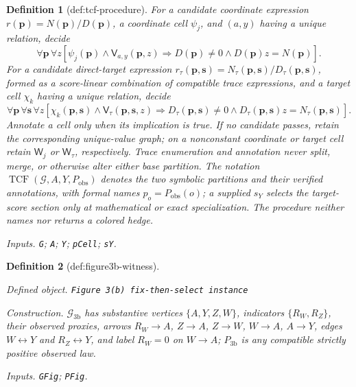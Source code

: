 \documentclass{article}
\newtheorem{definition}{Definition}
\begin{document}
\begin{definition}[def:tcf-procedure]
For a candidate coordinate expression \(r(\mathbf p)=N(\mathbf p)/D(\mathbf p)\), a coordinate cell \(\psi_j\), and \((a,y)\) having a unique relation, decide
\[
\forall\mathbf p\,\forall z
\left[
\psi_j(\mathbf p)\wedge\mathsf V_{a,y}(\mathbf p,z)
\Longrightarrow
D(\mathbf p)\neq0\wedge D(\mathbf p)z=N(\mathbf p)
\right].
\]
For a candidate direct-target expression \(r_{\tau}(\mathbf p,\mathbf s)=N_{\tau}(\mathbf p,\mathbf s)/D_{\tau}(\mathbf p,\mathbf s)\), formed as a score-linear combination of compatible trace expressions, and a target cell \(\chi_k\) having a unique relation, decide
\[
\forall\mathbf p\,\forall\mathbf s\,\forall z
\left[
\chi_k(\mathbf p,\mathbf s)\wedge\mathsf V_{\tau}(\mathbf p,\mathbf s,z)
\Longrightarrow
D_{\tau}(\mathbf p,\mathbf s)\neq0
\wedge D_{\tau}(\mathbf p,\mathbf s)z=N_{\tau}(\mathbf p,\mathbf s)
\right].
\]
Annotate a cell only when its implication is true. If no candidate passes, retain the corresponding unique-value graph; on a nonconstant coordinate or target cell retain \(\mathsf W_j\) or \(\mathsf W_{\tau}\), respectively. Trace enumeration and annotation never split, merge, or otherwise alter either base partition. The notation \(\operatorname{TCF}(\mathcal G,A,Y,P_{\mathrm{obs}})\) denotes the two symbolic partitions and their verified annotations, with formal names \(p_o=P_{\mathrm{obs}}(o)\); a supplied \(s_Y\) selects the target-score section only at mathematical or exact specialization. The procedure neither names nor returns a colored hedge.
\par\smallskip\noindent\emph{Inputs.} \texttt{G}; \texttt{A}; \texttt{Y}; \texttt{pCell}; \texttt{sY}.
\end{definition}

\begin{definition}[def:figure3b-witness]\label{def:figure3b-witness}
\par\smallskip\noindent\emph{Defined object.} \texttt{Figure 3(b) fix-\allowbreak{}then-\allowbreak{}select instance}
\par\smallskip\noindent\emph{Construction.} \(\mathcal G_{\mathrm{3b}}\) has substantive vertices \(\{A,Y,Z,W\}\), indicators \(\{R_W,R_Z\}\), their observed proxies, arrows \(R_W\to A\), \(Z\to A\), \(Z\to W\), \(W\to A\), \(A\to Y\), edges \(W\leftrightarrow Y\) and \(R_Z\leftrightarrow Y\), and label \(R_W=0\) on \(W\to A\); \(P_{\mathrm{3b}}\) is any compatible strictly positive observed law.
\par\smallskip\noindent\emph{Inputs.} \texttt{GFig}; \texttt{PFig}.
\end{definition}
\end{document}
